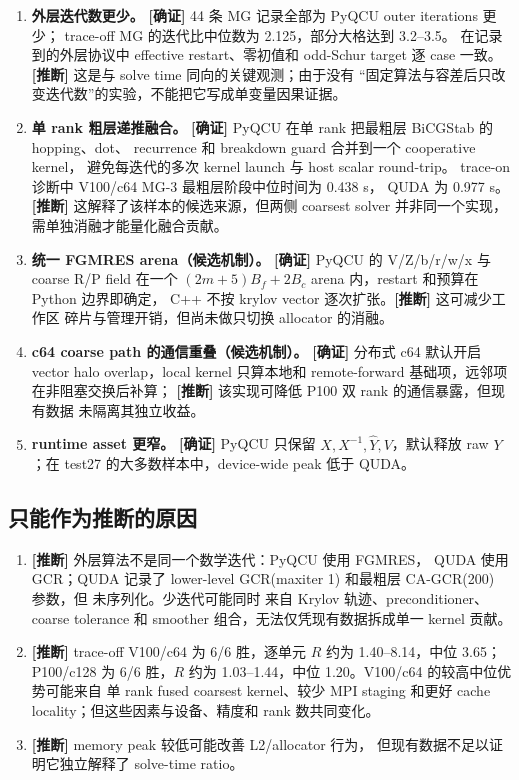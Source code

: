 \documentclass[UTF8,a4paper,11pt]{ctexart}
\newcommand{\code}[1]{\texttt{\detokenize{#1}}}
\newcommand{\confirmed}{\textcolor{evidencegreen}{\textbf{[确证]}}}
\newcommand{\inferred}{\textcolor{warnorange}{\textbf{[推断]}}}
\begin{document}
\begin{enumerate}[leftmargin=2em]
  \item \textbf{外层迭代数更少。}
        \confirmed{} 44 条 MG 记录全部为 PyQCU outer iterations 更少；
        trace-off MG 的迭代比中位数为 2.125，部分大格达到 3.2--3.5。
        在记录到的外层协议中 effective restart、零初值和 odd-Schur
        target 逐 case 一致。\inferred{} 这是与 solve time 同向的关键观测；由于没有
        “固定算法与容差后只改变迭代数”的实验，不能把它写成单变量因果证据。
  \item \textbf{单 rank 粗层递推融合。}
        \confirmed{} PyQCU 在单 rank 把最粗层 BiCGStab 的 hopping、dot、
        recurrence 和 breakdown guard 合并到一个 cooperative kernel，
        避免每迭代的多次 kernel launch 与 host scalar round-trip。
        trace-on 诊断中 V100/c64 MG-3 最粗层阶段中位时间为 0.438 s，
        QUDA 为 0.977 s。
        \inferred{} 这解释了该样本的候选来源，但两侧 coarsest solver
        并非同一个实现，需单独消融才能量化融合贡献。
  \item \textbf{统一 FGMRES arena（候选机制）。}
        \confirmed{} PyQCU 的 V/Z/b/r/w/x 与 coarse R/P field 在一个
        $(2m+5)B_f+2B_c$ arena 内，restart 和预算在 Python 边界即确定，
        C++ 不按 krylov vector 逐次扩张。\inferred{} 这可减少工作区
        碎片与管理开销，但尚未做只切换 allocator 的消融。
  \item \textbf{c64 coarse path 的通信重叠（候选机制）。}
        \confirmed{} 分布式 c64 默认开启 vector halo overlap，local kernel
        只算本地和 remote-forward 基础项，远邻项在非阻塞交换后补算；
        \inferred{} 该实现可降低 P100 双 rank 的通信暴露，但现有数据
        未隔离其独立收益。
  \item \textbf{runtime asset 更窄。}
        \confirmed{} PyQCU 只保留 $X,X^{-1},\widehat Y,V$，默认释放 raw
        $Y$；在 test27 的大多数样本中，device-wide peak 低于 QUDA。
\end{enumerate}

\subsection{只能作为推断的原因}

\begin{enumerate}[leftmargin=2em]
  \item \inferred{} 外层算法不是同一个数学迭代：PyQCU 使用 FGMRES，
        QUDA 使用 GCR；QUDA 记录了 lower-level GCR(maxiter 1) 和最粗层
        CA-GCR(200) 参数，但 \code{cycle_type} 未序列化。少迭代可能同时
        来自 Krylov 轨迹、preconditioner、
        coarse tolerance 和 smoother 组合，无法仅凭现有数据拆成单一
        kernel 贡献。
  \item \inferred{} trace-off V100/c64 为 6/6 胜，逐单元 $R$ 约为
        1.40--8.14，中位 3.65；P100/c128 为 6/6 胜，$R$ 约为
        1.03--1.44，中位 1.20。V100/c64 的较高中位优势可能来自
        单 rank fused coarsest kernel、较少 MPI staging 和更好 cache
        locality；但这些因素与设备、精度和 rank 数共同变化。
  \item \inferred{} memory peak 较低可能改善 L2/allocator 行为，
        但现有数据不足以证明它独立解释了 solve-time ratio。
\end{enumerate}
\end{document}
